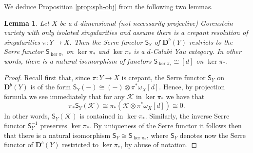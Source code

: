 \documentclass[a4paper,11pt, reqno]{amsart}
\def\DD{\mathbf D}
\def\sK{\mathscr{K}}
\def\Db{\DD^b}
\newcommand{\bS}{\mathsf{S}}
\theoremstyle{plain}
\newtheorem{lemma}[dummy]{Lemma}
\theoremstyle{definition}
\numberwithin{equation}{section}
\begin{document}
 We deduce Proposition \ref{prop:sph-obj} from the following two lemmas.

\begin{lemma}\label{lem:dCY-kernel}
    Let $X$ be a $d$-dimensional (not necessarily projective) Gorenstein variety with only isolated singularities and assume there is a crepant resolution of singularities $\pi : Y  \to X$. 
    Then the Serre functor $\bS_Y$ of $\Db(Y)$ restricts to the Serre functor $\bS_{\ker \pi_\ast }$ on $\ker  \pi_\ast  $ and $\ker \pi_\ast $ is a $d$-Calabi Yau category. 
    In other words, there is a natural isomorphism of functors $\bS_{\ker \pi_\ast } \cong [d]$ on $\ker  \pi_\ast $.
\end{lemma}

\begin{proof}
    Recall first that, since $\pi : Y \to X$ is crepant, the Serre functor $\bS_Y$ on $\Db(Y)$ is of the form $\bS_Y (-) \cong (-) \otimes \pi^\ast \omega_X[d]$.
    Hence, by projection formula 
    we see immediately that for any $\sK$ in $\ker \pi_\ast $ we have that
    \[
    \pi_\ast \bS_Y ( \sK ) \cong \pi_\ast (  \sK \otimes \pi^\ast \omega_X[d] ) \cong 0 .
    \]
    In other words, $\bS_Y ( \sK )$
    is contained in $\ker  \pi_\ast $.
    Similarly, the inverse Serre functor $\bS^{-1}_Y$ preserves $\ker \pi_\ast$.
    By uniqueness of the Serre functor it follows then that there is a natural isomorphism $\bS_Y \cong \bS_{\ker  \pi_\ast }$, where $\bS_Y$ denotes now the Serre functor of $\Db(Y)$ restricted to $\ker\pi_\ast$, by abuse of notation.


\end{proof}
\end{document}
